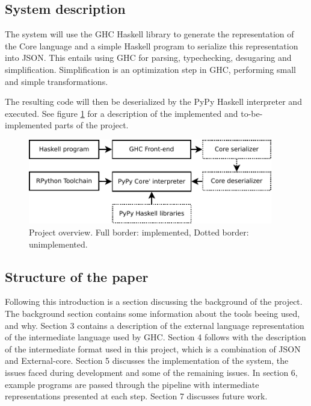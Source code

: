 \subsection{System description}

The system will use the GHC Haskell library to generate the 
representation of the Core language and a simple Haskell program to 
serialize this representation into JSON. This entails using GHC for
parsing, typechecking, desugaring and simplification. Simplification
is an optimization step in GHC, performing small and simple transformations.

The resulting code will then be deserialized by the PyPy Haskell interpreter 
and executed. See figure \ref{overview} for a description of the implemented and
to-be-implemented parts of the project.

\begin{figure}[H]
\centering
\includegraphics[width=0.95\textwidth]{diags/overview}
\caption[Project overview]{Project overview. Full border: implemented, Dotted border: unimplemented.}
\label{overview}
\end{figure}

\subsection{Structure of the paper}

Following this introduction is a section discussing the 
background of the project. The background section contains some information 
about the tools beeing used, and why.
Section 3 contains a description of the external language representation
of the intermediate language used by GHC.
Section 4 follows with the description of 
the intermediate format
used in this project, which is a combination of JSON and External-core.
Section 5 discusses the implementation of the system, the issues faced
during development and some of the remaining issues.
In section 6, example programs are passed through the pipeline 
with intermediate representations presented at each step.
Section 7 discusses future work.


